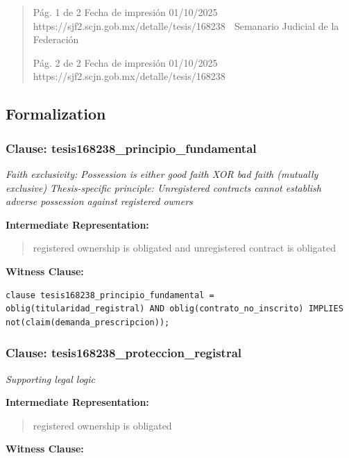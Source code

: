 \documentclass[11pt,a4paper]{article}
\begin{document}
\begin{quote}
                                             Pág. 1 de 2            Fecha de impresión 01/10/2025
  https://sjf2.scjn.gob.mx/detalle/tesis/168238
                                                Semanario Judicial de la Federación




                                           Pág. 2 de 2       Fecha de impresión 01/10/2025
https://sjf2.scjn.gob.mx/detalle/tesis/168238

\end{quote}

\subsection{Formalization}

\subsubsection{Clause: tesis168238\_principio\_fundamental}

\textit{Faith exclusivity: Possession is either good faith XOR bad faith (mutually exclusive) Thesis-specific principle: Unregistered contracts cannot establish adverse possession against registered owners}

\textbf{Intermediate Representation:}

\begin{quote}
registered ownership is obligated and unregistered contract is obligated
\end{quote}

\textbf{Witness Clause:}

\begin{lstlisting}[style=witnessstyle, language=Witness]
clause tesis168238_principio_fundamental = oblig(titularidad_registral) AND oblig(contrato_no_inscrito) IMPLIES not(claim(demanda_prescripcion));
\end{lstlisting}

\subsubsection{Clause: tesis168238\_proteccion\_registral}

\textit{Supporting legal logic}

\textbf{Intermediate Representation:}

\begin{quote}
registered ownership is obligated
\end{quote}

\textbf{Witness Clause:}
\end{document}
